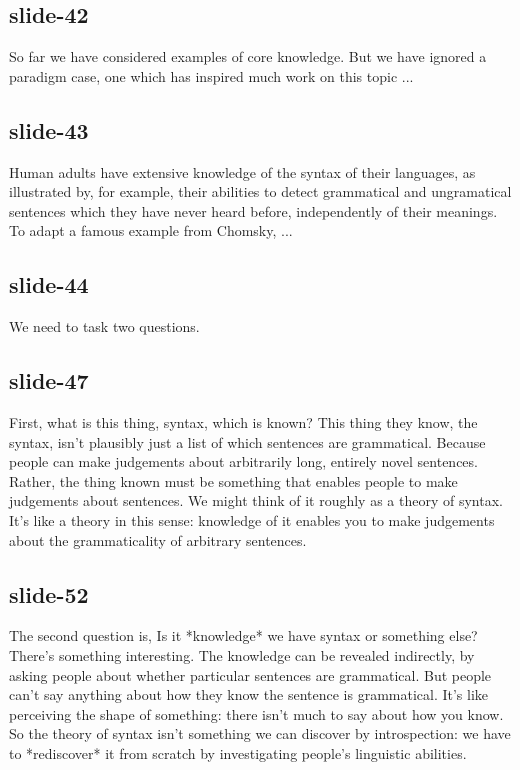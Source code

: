 \documentclass[12pt,\papersize]{extarticle}
\begin{document}
 
\subsection{slide-42}
So far we have considered examples of core knowledge. But we have ignored a paradigm case, one which has inspired much work on this topic ...
 
 
\subsection{slide-43}
Human adults have extensive knowledge of the syntax of their languages, as illustrated by, for example, their abilities to detect grammatical and ungramatical sentences which they have never heard before, independently of their meanings. To adapt a famous example from Chomsky, ...
 
 
\subsection{slide-44}
We need to task two questions.
 
 
\subsection{slide-47}
First, what is this thing, syntax, which is known?
This thing they know, the syntax, isn't plausibly just a list of which sentences are grammatical.
Because people can make judgements about arbitrarily long, entirely novel sentences.
Rather, the thing known must be something that enables people to make judgements about sentences.
We might think of it roughly as a theory of syntax.
It's like a theory in this sense: knowledge of it enables you to make judgements about the grammaticality of arbitrary sentences.
 
 
\subsection{slide-52}
The second question is, Is it *knowledge* we have syntax or something else?
There's something interesting.
The knowledge can be revealed indirectly, by asking people about whether particular sentences are grammatical.
But people can't say anything about how they know the sentence is grammatical.
It's like perceiving the shape of something: there isn't much to say about how you know.
So the theory of syntax isn't something we can discover by introspection:
we have to *rediscover* it from scratch by investigating people's linguistic abilities.
 
\end{document}
